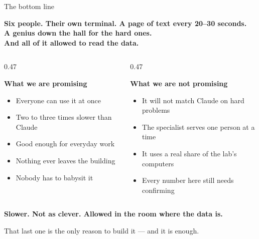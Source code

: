 \documentclass[aspectratio=169]{beamer}
\newcommand{\goodbox}[1]{%
  \begin{center}
  \colorbox{green!12}{\parbox{0.92\textwidth}{\centering #1}}
  \end{center}}
\begin{document}
\begin{frame}{The bottom line}

\goodbox{\large \textbf{Six people. Their own terminal. A page of text every 20--30
seconds.\\[0.25em] A genius down the hall for the hard ones.\\[0.25em] And all of it allowed to read
the data.}}

\vspace{0.7em}
\begin{columns}[T]
\begin{column}{0.47\textwidth}
{\small\textbf{What we are promising}
\begin{itemize}\small
\item Everyone can use it at once
\item Two to three times slower than Claude
\item Good enough for everyday work
\item Nothing ever leaves the building
\item Nobody has to babysit it
\end{itemize}}
\end{column}
\begin{column}{0.47\textwidth}
{\small\textbf{What we are not promising}
\begin{itemize}\small
\item It will not match Claude on hard problems
\item The specialist serves one person at a time
\item It uses a real share of the lab's computers
\item Every number here still needs confirming
\end{itemize}}
\end{column}
\end{columns}

\vspace{0.6em}
\begin{center}
\textbf{Slower. Not as clever. Allowed in the room where the data is.}

{\small That last one is the only reason to build it --- and it is enough.}
\end{center}

\end{frame}
\end{document}
